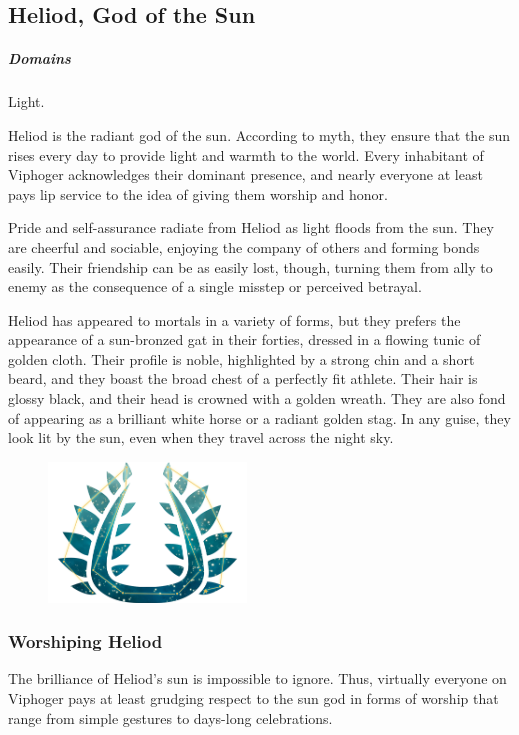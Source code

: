 \subsection*{Heliod, God of the Sun} \label{ssec::heliod}
    \subparagraph{Domains} Light.

    Heliod is the radiant god of the sun.
    According to myth, they ensure that the sun rises every day to provide light and warmth to the world.
    Every inhabitant of Viphoger acknowledges their dominant presence, and nearly everyone at least pays lip service to the idea of giving them worship and honor.

    Pride and self-assurance radiate from Heliod as light floods from the sun.
    They are cheerful and sociable, enjoying the company of others and forming bonds easily.
    Their friendship can be as easily lost, though, turning them from ally to enemy as the consequence of a single misstep or perceived betrayal.

    Heliod has appeared to mortals in a variety of forms, but they prefers the appearance of a sun-bronzed gat in their forties, dressed in a flowing tunic of golden cloth.
    Their profile is noble, highlighted by a strong chin and a short beard, and they boast the broad chest of a perfectly fit athlete.
    Their hair is glossy black, and their head is crowned with a golden wreath.
    They are also fond of appearing as a brilliant white horse or a radiant golden stag.
    In any guise, they look lit by the sun, even when they travel across the night sky.

    \begin{figure}[t]
        \centering
        \includegraphics[width=0.47\textwidth]{02viphoger/img/10s_heliod.png}
    \end{figure}

    \subsubsection{Worshiping Heliod}
        The brilliance of Heliod's sun is impossible to ignore.
        Thus, virtually everyone on Viphoger pays at least grudging respect to the sun god in forms of worship that range from simple gestures to days-long celebrations.

